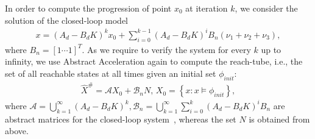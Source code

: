 \documentclass[twocolumn]{autart}    %
\newcommand{\mat}[1]{{#1}}
\begin{document}
\begin{enumerate}
  In order to compute the progression of point $x_0$ at iteration $k$,
  we consider the solution of the closed-loop model 
%
{
\scriptsize
\begin{align*}
x=(A_d-B_dK)^kx_0+ \sum_{i=0}^{k-1} (A_d-B_dK)^i B_{n}(\nu_1+\nu_2+\nu_3), 
\end{align*}
}
where $B_n= [1 \cdots 1]^T$. 
%
As we require to verify the system for every $k$ up to infinity, 
we use Abstract Acceleration again to compute the reach-tube, 
i.e., the set of all reachable states at all times given an initial set
$\phi_\mathit{init}$:
%
\begin{align}
\label{eq:aa_observer_LTI_cf}
\hat{X}^\#
=\mathcal{A} X_0 + \mathcal{B}_{n} N, \,
X_0 =\left \{x: x \models \phi_\mathit{init} \right\}, 
\end{align} 
%
where $\mathcal{A}=\bigcup_{k=1}^\infty (A_d-B_dK)^k,
\mathcal{B}_{n}=\bigcup_{k=1}^\infty \sum_{i=0}^k(A_d-B_dK)^iB_{n}$ are
abstract matrices for the closed-loop system~\cite{cattaruzza2015unbounded},
whereas the set $N$ is obtained from above. 


\end{enumerate}
\end{document}
